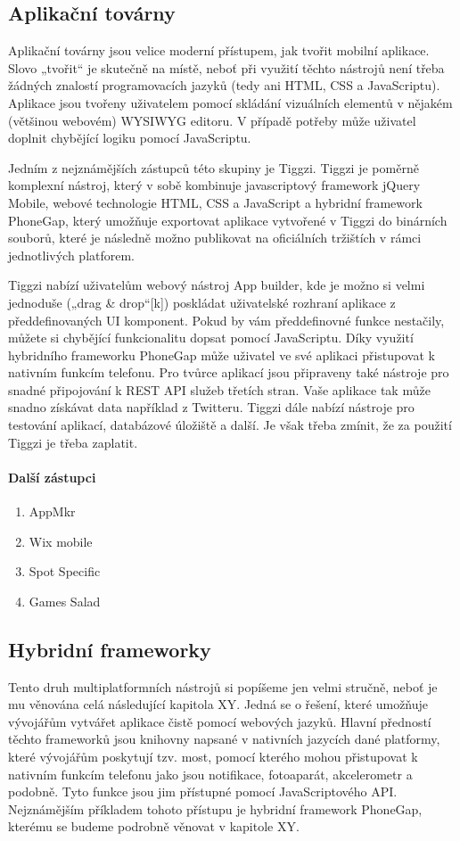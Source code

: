 \subsection{Aplikační továrny}
Aplikační továrny jsou velice moderní přístupem, jak tvořit mobilní aplikace. Slovo „tvořit“ je skutečně na místě, neboť při využití těchto nástrojů není třeba žádných znalostí programovacích jazyků (tedy ani HTML, CSS a JavaScriptu). Aplikace jsou tvořeny uživatelem pomocí skládání vizuálních elementů v nějakém (většinou webovém) WYSIWYG editoru. V případě potřeby může uživatel doplnit chybějící logiku pomocí JavaScriptu.

Jedním z nejznámějších zástupců této skupiny je Tiggzi. Tiggzi je poměrně komplexní nástroj, který v sobě kombinuje javascriptový framework jQuery Mobile, webové technologie HTML, CSS a JavaScript a hybridní framework PhoneGap, který umožňuje exportovat aplikace vytvořené v Tiggzi do binárních souborů, které je následně možno publikovat na oficiálních tržištích v rámci jednotlivých platforem.

Tiggzi nabízí uživatelům webový nástroj App builder, kde je možno si velmi jednoduše („drag \& drop“[k]) poskládat uživatelské rozhraní aplikace z předdefinovaných UI komponent. Pokud by vám předdefinovné funkce nestačily, můžete si chybějící funkcionalitu dopsat pomocí JavaScriptu. Díky využití hybridního frameworku PhoneGap může uživatel ve své aplikaci přistupovat k nativním funkcím telefonu. Pro tvůrce aplikací jsou připraveny také nástroje pro snadné připojování k REST API služeb třetích stran. Vaše aplikace tak může snadno získávat data například z Twitteru. Tiggzi dále nabízí nástroje pro testování aplikací, databázové úložiště a další. Je však třeba zmínit, že za použití Tiggzi je třeba zaplatit.

\paragraph{Další zástupci}
\begin{enumerate}
	\item AppMkr
	\item Wix mobile
	\item Spot Specific
	\item Games Salad
\end{enumerate}

\subsection{Hybridní frameworky}
Tento druh multiplatformních nástrojů si popíšeme jen velmi stručně, neboť je mu věnována celá následující kapitola XY. Jedná se o řešení, které umožňuje vývojářům vytvářet aplikace čistě pomocí webových jazyků. Hlavní předností těchto frameworků jsou knihovny napsané v nativních jazycích dané platformy, které vývojářům poskytují tzv. most, pomocí kterého mohou přistupovat k nativním funkcím telefonu jako jsou notifikace, fotoaparát, akcelerometr a podobně. Tyto funkce jsou jim přístupné pomocí JavaScriptového API.
Nejznámějším příkladem tohoto přístupu je hybridní framework PhoneGap, kterému se budeme podrobně věnovat v kapitole XY.

